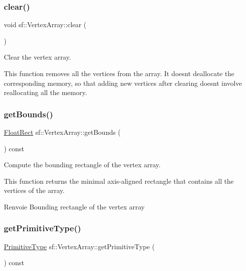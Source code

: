 \subsubsection{\texorpdfstring{clear()}{clear()}}
{\footnotesize\ttfamily void sf\+::\+Vertex\+Array\+::clear (\begin{DoxyParamCaption}{ }\end{DoxyParamCaption})}



Clear the vertex array. 

This function removes all the vertices from the array. It doesn\textquotesingle{}t deallocate the corresponding memory, so that adding new vertices after clearing doesn\textquotesingle{}t involve reallocating all the memory. \mbox{\label{classsf_1_1VertexArray_abd57744c732abfc7d4c98d8e1d4ccca1}} 
\subsubsection{\texorpdfstring{get\+Bounds()}{getBounds()}}
{\footnotesize\ttfamily \hyperlink{classsf_1_1Rect}{Float\+Rect} sf\+::\+Vertex\+Array\+::get\+Bounds (\begin{DoxyParamCaption}{ }\end{DoxyParamCaption}) const}



Compute the bounding rectangle of the vertex array. 

This function returns the minimal axis-\/aligned rectangle that contains all the vertices of the array.

\begin{DoxyReturn}{Renvoie}
Bounding rectangle of the vertex array 
\end{DoxyReturn}
\mbox{\label{classsf_1_1VertexArray_aa1a60d84543aa6e220683349b645f130}} 
\subsubsection{\texorpdfstring{get\+Primitive\+Type()}{getPrimitiveType()}}
{\footnotesize\ttfamily \hyperlink{group__graphics_ga5ee56ac1339984909610713096283b1b}{Primitive\+Type} sf\+::\+Vertex\+Array\+::get\+Primitive\+Type (\begin{DoxyParamCaption}{ }\end{DoxyParamCaption}) const}



